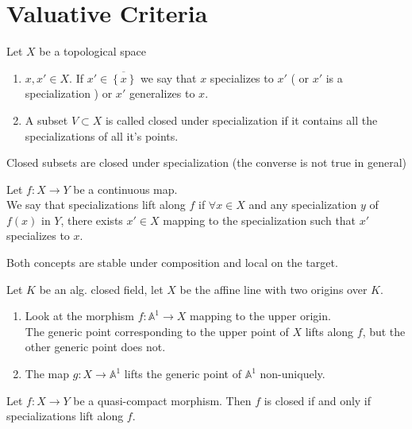 \documentclass[../main.tex]{subfiles}
\begin{document}
\section{Valuative Criteria}
\begin{defn}[Specializations]
Let $X$ be a topological space
\begin{enumerate}
	\item $x,x'\in X$. If $x' \in\overline{ \left\{ x \right\}} $ we say that $x$ specializes to $x'$ ( or $x'$ is a specialization ) or $x'$ generalizes to $x$.
	\item A subset $V\subset X$ is called closed under specialization if it contains all the specializations of all it's points.
\end{enumerate}
\end{defn}
\begin{rmq}
Closed subsets are closed under specialization (the converse is not true in general)
\end{rmq}
\begin{defn}
Let $f:X\to Y$ be a continuous map.\\
We say that specializations lift along $f$ if $\forall x\in X$ and any specialization $y$ of $ f( x) $ in $Y$, there exists $x' \in X$ mapping to the specialization such that $x'$ specializes to $x$.
\end{defn}
\begin{rmq}
Both concepts are stable under composition and local on the target.
\end{rmq}
\begin{exemple}
Let $K$ be an alg. closed field, let $X$ be the affine line with two origins over $K$.
\begin{enumerate}
\item Look at the morphism $f:\mathbb{A}^{1}\to X$ mapping to the upper origin.\\
	The generic point corresponding to the upper point of $X$ lifts along $f$, but the other generic point does not.

\item The map $g: X\to \mathbb{A}^{1}$ lifts the generic point of $\mathbb{A}^{1}$ non-uniquely.
\end{enumerate}
\end{exemple}
\begin{lemma}
Let $f:X\to Y$ be a quasi-compact morphism. Then $f$ is closed if and only if specializations lift along $f$.
\end{lemma}
\end{document}

